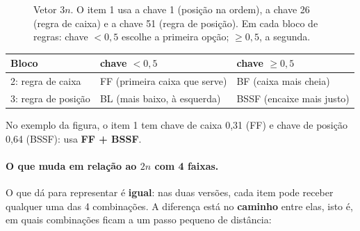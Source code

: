 \documentclass[11pt,a4paper]{article}
\begin{document}
\begin{figure}[H]
\centering
{}
\caption{Vetor $3n$. O item 1 usa a chave 1 (posição na ordem), a chave 26 (regra de caixa) e a chave 51 (regra de
posição). Em cada bloco de regras: chave $<0{,}5$ escolhe a primeira opção; $\ge0{,}5$, a segunda.}
\end{figure}

\begin{center}\small
\begin{tabular}{@{}lll@{}}
\toprule
Bloco & chave $<0{,}5$ & chave $\ge0{,}5$ \\ \midrule
2: regra de caixa & FF (primeira caixa que serve) & BF (caixa mais cheia) \\
3: regra de posição & BL (mais baixo, à esquerda) & BSSF (encaixe mais justo) \\
\bottomrule
\end{tabular}
\end{center}
No exemplo da figura, o item 1 tem chave de caixa 0,31 (FF) e chave de posição 0,64 (BSSF): usa \textbf{FF + BSSF}.

\paragraph{O que muda em relação ao $2n$ com 4 faixas.} O que dá para representar é \textbf{igual}: nas duas versões,
cada item pode receber qualquer uma das 4 combinações. A diferença está no \textbf{caminho} entre elas, isto é, em
quais combinações ficam a um passo pequeno de distância:
\end{document}
